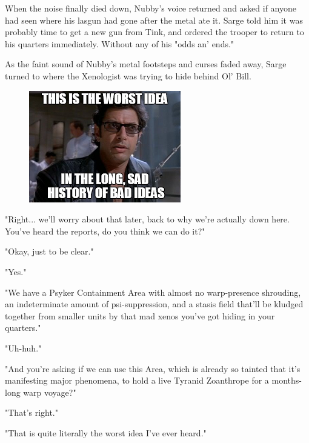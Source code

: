When the noise finally died down, Nubby's voice returned and asked if anyone had seen where his lasgun had gone after the metal ate it. 
Sarge told him it was probably time to get a new gun from Tink, and ordered the trooper to return to his quarters immediately. 
Without any of his "odds an' ends."

As the faint sound of Nubby's metal footsteps and curses faded away, Sarge turned to where the Xenologist was trying to hide behind Ol' Bill.
\begin{figure}
	\begin{center}
		\includegraphics[width=\figwidth]{pics/12/5.png}
	\end{center}
\end{figure}
"Right... 
we'll worry about that later, back to why we're actually down here. 
You've heard the reports, do you think we can do it?"

"Okay, just to be clear."

"Yes."

"We have a Psyker Containment Area with almost no warp-presence shrouding, an indeterminate amount of psi-suppression, and a stasis field that'll be kludged together from smaller units by that mad xenos you've got hiding in your quarters."

"Uh-huh."

"And you're asking if we can use this Area, which is already so tainted that it's manifesting major phenomena, to hold a live Tyranid Zoanthrope for a months-long warp voyage?"

"That's right."

"That is quite literally the worst idea I've ever heard."



